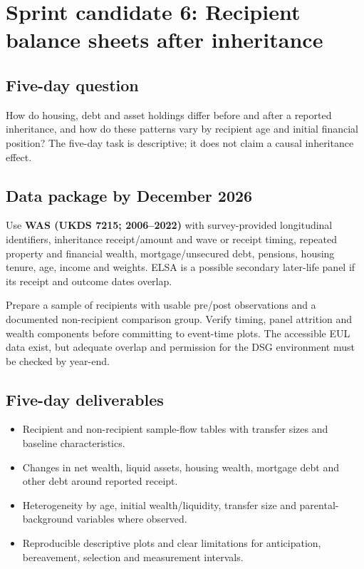 \section{Sprint candidate 6: Recipient balance sheets after inheritance}
\label{sec:outcomes}

\subsection{Five-day question}
How do housing, debt and asset holdings differ before and after a reported inheritance, and how do these patterns vary by recipient age and initial financial position? The five-day task is descriptive; it does not claim a causal inheritance effect.

\subsection{Data package by December 2026}
Use \textbf{WAS (UKDS 7215; 2006--2022)} with survey-provided longitudinal identifiers, inheritance receipt/amount and wave or receipt timing, repeated property and financial wealth, mortgage/unsecured debt, pensions, housing tenure, age, income and weights. ELSA is a possible secondary later-life panel if its receipt and outcome dates overlap.

Prepare a sample of recipients with usable pre/post observations and a documented non-recipient comparison group. Verify timing, panel attrition and wealth components before committing to event-time plots. The accessible EUL data exist, but adequate overlap and permission for the DSG environment must be checked by year-end.

\subsection{Five-day deliverables}
\begin{itemize}[nosep]
\item Recipient and non-recipient sample-flow tables with transfer sizes and baseline characteristics.
\item Changes in net wealth, liquid assets, housing wealth, mortgage debt and other debt around reported receipt.
\item Heterogeneity by age, initial wealth/liquidity, transfer size and parental-background variables where observed.
\item Reproducible descriptive plots and clear limitations for anticipation, bereavement, selection and measurement intervals.
\end{itemize}

